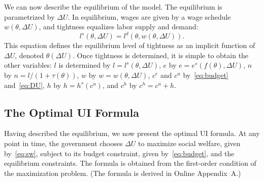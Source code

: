 \documentclass[letterpaper,12pt,leqno]{article}
\def \D{{\Delta}}
\def \t{{\theta}}
\begin{document}
We can now describe the equilibrium of the model. The equilibrium is parametrized by $\D U$. In equilibrium, wages are given by a wage schedule $w(\t,\D U)$, and tightness equalizes labor supply and demand:
\begin{equation*}
l^{s}(\t,\D U)=l^{d}(\t,w(\t,\D U)).
\end{equation*}
This equation defines the equilibrium level of tightness as an implicit function of $\D U$, denoted $\t(\D U)$.  Once tightness is determined, it is simple to obtain the other variables: $l$ is determined by $l=l^s(\t,\D U)$, $e$ by $e=e^s(f(\t),\D U)$, $n$ by $n=l/(1+\tau(\t))$, $w$ by $w=w(\t,\D U)$, $c^{e}$ and $c^u$ by~\eqref{eq:budget} and~\eqref{eq:DU}, $h$ by $h=h^s(c^{u})$, and $c^h$ by $c^h=c^u+h$. 

\subsection{The Optimal UI Formula}

Having described the equilibrium, we now present the optimal UI formula. At any point in time, the government chooses $\D U$ to maximize social welfare, given by~\eqref{eq:sw}, subject to its budget constraint, given by~\eqref{eq:budget}, and the equilibrium constraints. The  formula is obtained from the first-order condition of the maximization problem. (The formula is derived in Online Appendix~A.) 
\end{document}
